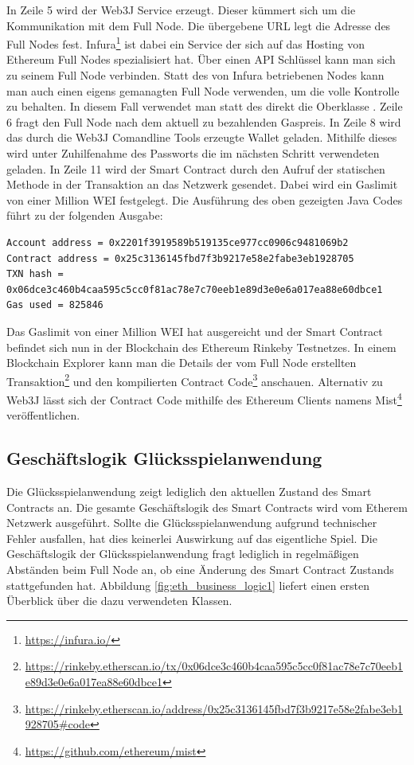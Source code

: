 In Zeile 5 wird der Web3J Service erzeugt. Dieser kümmert sich um die Kommunikation mit dem Full Node. Die übergebene URL legt die Adresse des Full Nodes fest. Infura\footnote{\url{https://infura.io/}} ist dabei ein Service der sich auf das Hosting von Ethereum Full Nodes spezialisiert hat. Über einen API Schlüssel kann man sich zu seinem Full Node verbinden. Statt des von Infura betriebenen Nodes kann man auch einen eigens gemanagten Full Node verwenden, um die volle Kontrolle zu behalten. In diesem Fall verwendet man statt des  direkt die Oberklasse .
Zeile 6 fragt den Full Node nach dem aktuell zu bezahlenden Gaspreis.
In Zeile 8 wird das durch die Web3J Comandline Tools erzeugte Wallet geladen. Mithilfe dieses wird unter Zuhilfenahme des Passworts die im nächsten Schritt verwendeten  geladen.
In Zeile 11 wird der Smart Contract durch den Aufruf der statischen  Methode in der Transaktion an das Netzwerk gesendet. Dabei wird ein Gaslimit von einer Million WEI festgelegt.
Die Ausführung des oben gezeigten Java Codes führt zu der folgenden Ausgabe:

\begin{lstlisting}[basicstyle=\small]
Account address = 0x2201f3919589b519135ce977cc0906c9481069b2
Contract address = 0x25c3136145fbd7f3b9217e58e2fabe3eb1928705
TXN hash = 0x06dce3c460b4caa595c5cc0f81ac78e7c70eeb1e89d3e0e6a017ea88e60dbce1
Gas used = 825846
\end{lstlisting}

Das Gaslimit von einer Million WEI hat ausgereicht und der Smart Contract befindet sich nun in der Blockchain des Ethereum Rinkeby Testnetzes. In einem Blockchain Explorer kann man die Details der vom Full Node erstellten Transaktion\footnote{\url{https://rinkeby.etherscan.io/tx/0x06dce3c460b4caa595c5cc0f81ac78e7c70eeb1e89d3e0e6a017ea88e60dbce1}} und den kompilierten Contract Code\footnote{\url{https://rinkeby.etherscan.io/address/0x25c3136145fbd7f3b9217e58e2fabe3eb1928705\#code}} anschauen.
\if Alternativ zu Web3J lässt sich der Contract Code mithilfe des Ethereum Clients namens Mist\footnote{\url{https://github.com/ethereum/mist}} veröffentlichen.
\fi

\subsection{Geschäftslogik Glücksspielanwendung}

Die Glücksspielanwendung zeigt lediglich den aktuellen Zustand des Smart Contracts an. Die gesamte Geschäftslogik des Smart Contracts wird vom Etherem Netzwerk ausgeführt. Sollte die Glücksspielanwendung aufgrund technischer Fehler ausfallen, hat dies keinerlei Auswirkung auf das eigentliche Spiel. Die Geschäftslogik der Glücksspielanwendung fragt lediglich in regelmäßigen Abständen beim Full Node an, ob eine Änderung des Smart Contract Zustands stattgefunden hat. Abbildung \ref{fig:eth_business_logic1} liefert einen ersten Überblick über die dazu verwendeten Klassen.

